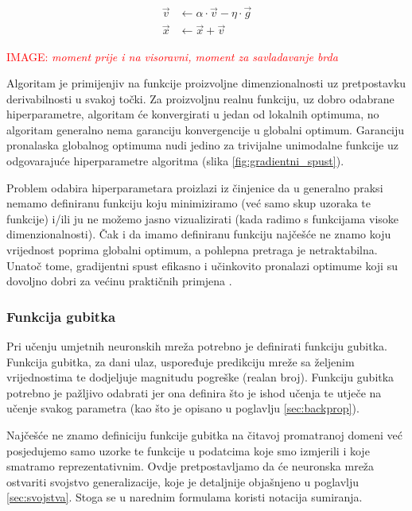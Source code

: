 \documentclass[times, utf8, diplomski]{fer}
\def\todoimg#1{\begin{center} \textcolor{red}{IMAGE: \textit{#1}} \end{center}}
\begin{document}
\begin{equation}
\label{eq:moment_update}
\begin{split}
\vec{v} &\gets \alpha \cdot \vec{v} - \eta \cdot \vec{g} \\
\vec{x} &\gets \vec{x} + \vec{v}
\end{split}
\end{equation}

\todoimg{moment prije i na visoravni, moment za savladavanje brda}
\label{fig:visoravan}

Algoritam je primijenjiv na funkcije proizvoljne dimenzionalnosti uz pretpostavku derivabilnosti u svakoj točki. Za proizvoljnu realnu funkciju, uz dobro odabrane hiperparametre, algoritam će konvergirati u jedan od lokalnih optimuma, no algoritam generalno nema garanciju konvergencije u globalni optimum. Garanciju pronalaska globalnog optimuma nudi jedino za trivijalne unimodalne funkcije uz odgovarajuće hiperparametre algoritma (slika \ref{fig:gradientni_spust}).

Problem odabira hiperparametara proizlazi iz činjenice da u generalno praksi nemamo definiranu funkciju koju minimiziramo (već samo skup uzoraka te funkcije) i/ili ju ne možemo jasno vizualizirati (kada radimo s funkcijama visoke dimenzionalnosti). Čak i da imamo definiranu funkciju najčešće ne znamo koju vrijednost poprima globalni optimum, a pohlepna pretraga je netraktabilna. Unatoč tome, gradijentni spust efikasno i učinkovito pronalazi optimume koji su dovoljno dobri za većinu praktičnih primjena \citep{yolo}.

\subsubsection{Funkcija gubitka}
Pri učenju umjetnih neuronskih mreža potrebno je definirati funkciju gubitka. Funkcija gubitka, za dani ulaz, uspoređuje predikciju mreže sa željenim vrijednostima te dodjeljuje magnitudu pogreške (realan broj). Funkciju gubitka potrebno je pažljivo odabrati jer ona definira što je ishod učenja te utječe na učenje svakog parametra (kao što je opisano u poglavlju \ref{sec:backprop}). 

Najčešće ne znamo definiciju funkcije gubitka na čitavoj promatranoj domeni već posjedujemo samo uzorke te funkcije u podatcima koje smo izmjerili i koje smatramo reprezentativnim. Ovdje pretpostavljamo da će neuronska mreža ostvariti svojstvo generalizacije, koje je detaljnije objašnjeno u poglavlju \ref{sec:svojstva}. Stoga se u narednim formulama koristi notacija sumiranja.
\end{document}
